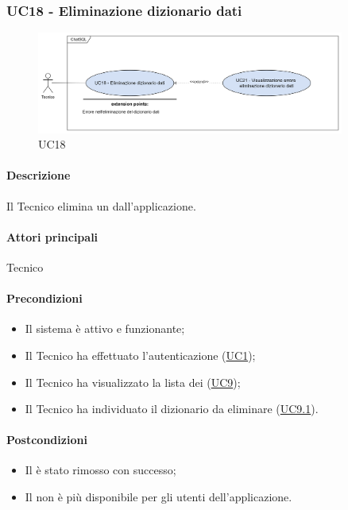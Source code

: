 \subsubsection{UC18 - Eliminazione dizionario dati}\label{UC18}

\begin{figure}[H]
  \centering
  \includegraphics[width=0.90\textwidth]{assets/uc18.png}
  \caption{UC18}
\end{figure}

\paragraph*{Descrizione}
Il Tecnico elimina un  dall'applicazione.

\paragraph*{Attori principali}
Tecnico

\paragraph*{Precondizioni}
\begin{itemize}
  \item Il sistema è attivo e funzionante;
  \item Il Tecnico ha effettuato l'autenticazione (\hyperref[UC1]{UC1});
  \item Il Tecnico ha visualizzato la lista dei  (\hyperref[UC9]{UC9});
  \item Il Tecnico ha individuato il dizionario da eliminare (\hyperref[UC9.1]{UC9.1}).
\end{itemize}

\paragraph*{Postcondizioni}
\begin{itemize}
  \item Il  è stato rimosso con successo;
  \item Il  non è più disponibile per gli utenti dell'applicazione.
\end{itemize}

